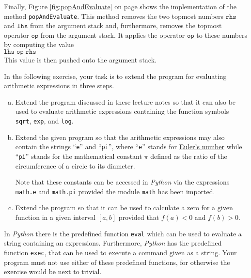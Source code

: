 Finally, Figure \ref{fig:popAndEvaluate} on page \pageref{fig:popAndEvaluate} shows the implementation of the
method \texttt{popAndEvaluate}.
This method removes the two topmost numbers $\texttt{rhs}$ and $\texttt{lhs}$ from the argument stack and,
furthermore, removes the topmost operator $\texttt{op}$ from the argument stack.  It applies the operator
$\texttt{op}$ to these numbers 
by computing the value 
\\[0.2cm]
\hspace*{1.3cm}
$ \texttt{lhs} \;\texttt{op}\; \texttt{rhs} $
\\[0.2cm]
This value is then pushed onto the argument stack.

\exercise
In the following exercise, your task is to extend the program for evaluating arithmetic expressions in three steps.
\begin{enumerate}[(a)]
\item Extend the program discussed in these lecture notes so that it can also be used to evaluate
      arithmetic expressions containing the function symbols
      \\[0.2cm]
      \hspace*{1.3cm}
      \texttt{sqrt}, \texttt{exp}, and \texttt{log}.
\item Extend the given program so that the arithmetic expressions may also contain 
      the strings ``\texttt{e}'' and ``\texttt{pi}'', where ``\texttt{e}'' stands for 
      \href{http://en.wikipedia.org/wiki/E_(mathematical_constant)}{Euler's number} 
      while ``\texttt{pi}'' stands for the mathematical constant
      \href{http://en.wikipedia.org/wiki/Pi}{$\pi$} defined as the ratio of the circumference of a
      circle to its diameter. 

      Note that these constants can be accessed in \textsl{Python} via the expressions \texttt{math.e}
      and \texttt{math.pi} provided the module \texttt{math} has been imported.
\item Extend the program so that it can be used to calculate a zero for a given function in a given
      interval $[a,b]$ provided that $f(a) < 0$ and $f(b) > 0$.  
\end{enumerate}
In \textsl{Python} there is the predefined function \texttt{eval} which can be used to evaluate a string
containing an expressions.  Furthermore, \textsl{Python} has the predefined function \texttt{exec}, that can be
used to execute a command given as a string.  Your program must not use either of these predefined functions,
for otherwise the exercise would be next to trivial.
\eox



